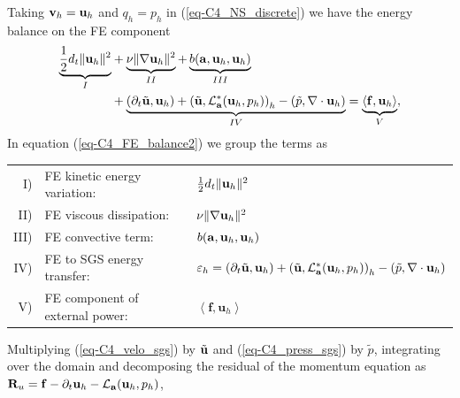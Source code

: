 Taking ${\bf v}_h={\bf u}_h$ and $q_h=p_h$ in (\ref{eq-C4_NS_discrete}) we have the energy balance on the FE component
\begin{align}
\label{eq-C4_FE_balance2}
\underbrace{\frac{1}{2}d_t\|{\bf u}_h\|^2}_I
& +\underbrace{\nu\|\nabla{\bf u}_h\|^2}_{II}
  +\underbrace{b({\bf a},{\bf u}_h,{\bf u}_h)}_{III} \\ \nonumber
& +\underbrace{(\partial_t\tilde{{\bf u}},{\bf u}_h)
+\left(\tilde{{\bf u}},\mathcal{L}^*_{{\bf a}}({\bf u}_h,p_h)\right)_h
-\left(\tilde{p},\nabla\cdot{\bf u}_h\right)}_{IV}
=\underbrace{\left<\mathbf{f},\mathbf{u}_h\right>}_V,
\end{align}
In equation (\ref{eq-C4_FE_balance2}) we group the terms as
\begin{center}
\begin{tabular}{rll}
I)&FE kinetic energy variation:&$\frac{1}{2}d_t\|{\bf u}_h\|^2$\\
II)&FE viscous dissipation:&$\nu\|\nabla{\bf u}_h\|^2$\\
III)&FE convective term:&$b({\bf a},{\bf u}_h,{\bf u}_h)$\\
IV)&FE to SGS energy transfer:&$\varepsilon_{h} =(\partial_t\tilde{{\bf u}},{\bf u}_h)+\left(\tilde{{\bf u}},\mathcal{L}^*_{{\bf a}}({\bf u}_h,p_h)\right)_h-\left(\tilde{p},\nabla\cdot{\bf u}_h\right)$\\
V)&FE component of external power:& $\left<\mathbf{f},\mathbf{u}_h\right>$\\
\end{tabular}
\end{center}
Multiplying (\ref{eq-C4_velo_sgs}) by $\tilde{{\bf u}}$ and (\ref{eq-C4_press_sgs}) by $\tilde{p}$, integrating over the domain and decomposing the residual of the momentum equation as ${\bf R}_u={\bf f}-\partial_t{\bf u}_h-\mathcal{L}_{{\bf a}}({\bf u}_h,p_h)$, %
